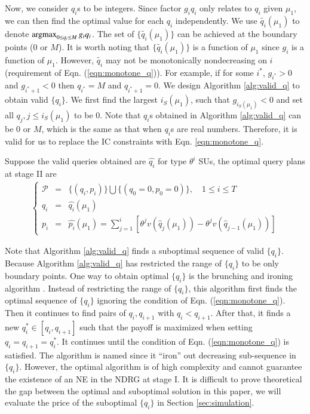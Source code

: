 \documentclass[journal]{IEEEtran}
\newcommand{\argmax}{\operatornamewithlimits{argmax}}
\begin{document}
Now, we consider $q_i$s to be integers. Since factor $g_iq_i$ only relates to $q_i$ given $\mu_1$, we can then find the optimal value for each $q_i$ independently. We use $\tilde{q_i}(\mu_1)$ to denote $\argmax_{0\leq q_i\leq  M} g_iq_i$. The set of $\{\tilde{q_i}(\mu_1)\}$ can be achieved at the boundary points (0 or $M$). It is worth noting that $\{\tilde{q_i}(\mu_1)\}$ is a function of $\mu_1$ since $g_i$ is a function of $\mu_1$. However, $\tilde{q_i}$ may not be monotonically nondecreasing on $i$ (requirement of Eqn. (\ref{eqn:monotone_q})). For example, if for some $i^*$, $g_{i^*}>0$ and $g_{i^*+1}<0$ then $q_{i^*}=M$ and $q_{i^*+1}=0$. We design Algorithm \ref{alg:valid_q} to obtain valid $\{q_i\}$. We first find the largest $i_S(\mu_1)$, such that $g_{i_S(\mu_1)}<0$ and set all $q_{j}, j\leq i_S(\mu_1)$ to be 0. Note that $q_i$s obtained in Algorithm \ref{alg:valid_q} can be 0 or $M$, which is the same as that when $q_i$s are real numbers. Therefore, it is valid for us to replace the IC constraints with Eqn. \ref{eqn:monotone_q}.

Suppose the valid queries obtained are $\hat{q_i}$ for type $\theta^i$ SUs, the optimal query plans at stage II are
\begin{eqnarray*}
\left\{
\begin{array}{lll}
\mathcal{P}&=&\{(q_i, p_i)\}\bigcup\{(q_0=0, p_0=0)\},\quad 1\leq i \leq T \\
q_i&=&\hat{q_i}(\mu_1)\\
p_i&=&\hat{p_i}(\mu_1)=\sum_{j=1}^i \left[\theta^jv(\hat{q}_j(\mu_1))-\theta^jv(\hat{q}_{j-1}(\mu_1))\right]
\end{array}
\right.
\end{eqnarray*}

Note that Algorithm \ref{alg:valid_q} finds a suboptimal sequence of valid $\{q_i\}$. Because Algorithm \ref{alg:valid_q} has restricted the range of $\{q_i\}$ to be only boundary points. One way to obtain optimal $\{q_i\}$ is the brunching and ironing algorithm \cite{contract_book}. Instead of restricting the range of $\{q_i\}$, this algorithm first finds the optimal sequence of $\{q_i\}$ ignoring the condition of Eqn. (\ref{eqn:monotone_q}). Then it continues to find pairs of $q_i, q_{i+1}$ with $q_i<q_{i+1}$. After that, it finds a new $q_i^*\in[q_i, q_{i+1}]$ such that the payoff is maximized when setting $q_i=q_{i+1}=q_i^*$. It continues until the condition of Eqn. (\ref{eqn:monotone_q}) is satisfied. The algorithm is named since it ``iron'' out decreasing sub-sequence in $\{q_i\}$.  However, the optimal algorithm is of high complexity and cannot guarantee the existence of an NE in the NDRG at stage I. It is difficult to prove theoretical the gap between the optimal and suboptimal solution in this paper, we will evaluate the price of the suboptimal $\{q_i\}$ in Section \ref{sec:simulation}.
\end{document}
